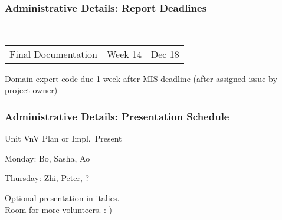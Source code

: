 \documentclass[t,12pt,numbers,fleqn]{beamer}
\begin{document}



\begin{frame}
\frametitle{Administrative Details: Report Deadlines}
~\newline
\begin{tabular}{l l l}
Final Documentation & Week 14 & Dec 18\\
\end {tabular}

\bi
\item Domain expert code due 1 week after MIS deadline (after assigned issue by
  project owner)
\ei

\end{frame}


\begin{frame}
\frametitle{Administrative Details: Presentation Schedule}

\bi
\item Unit VnV Plan or Impl.\ Present
\bi
\item Monday: Bo, Sasha, Ao
\item Thursday: Zhi, Peter, ?
\ei
\ei

Optional presentation in italics.\\
Room for more volunteers.  :-)

\end{frame}

\end{document}
